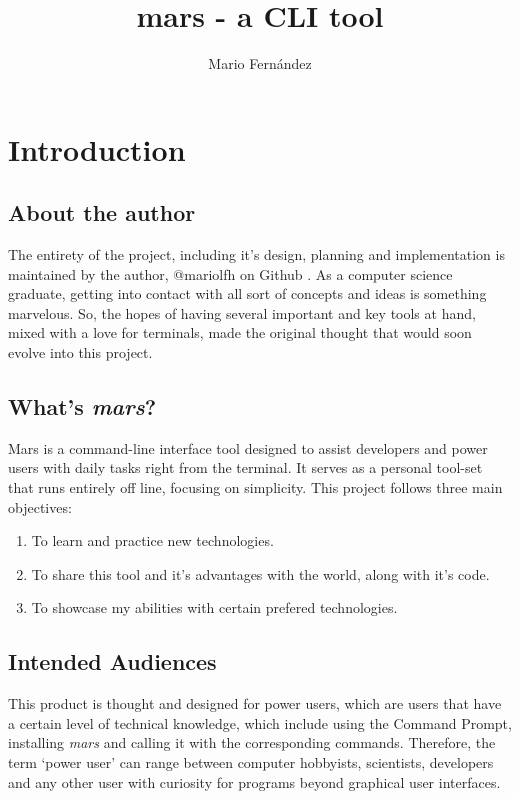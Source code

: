 \documentclass{report}
\title{mars - a CLI tool}
\author{Mario Fernández}
\begin{document}
\maketitle

\tableofcontents

\chapter{Introduction}
\section{About the author}
The entirety of the project, including it's design, planning and implementation is maintained by the author, @mariolfh on Github \cite{githubinc.MariolfhOverview2025}. As a computer science graduate, getting into contact with all sort of concepts and ideas is something marvelous. So, the hopes of having several important and key tools at hand, mixed with a love for terminals, made the original thought that would soon evolve into this project. 

\section{What's \emph{mars}?}
Mars is a command-line interface tool designed to assist developers and power users with daily tasks right from the terminal. It serves as a personal tool-set that runs entirely off line, focusing on simplicity.
This project follows three main objectives:
\begin{enumerate}
\item{To learn and practice new technologies.}
\item{To share this tool and it's advantages with the world, along with it's code.}
\item{To showcase my abilities with certain prefered technologies.}
\end{enumerate}

\section{Intended Audiences}
This product is thought and designed for power users, which are users that have a certain level of technical knowledge, which include using the Command Prompt, installing \emph{mars} and calling it with the corresponding commands. Therefore, the term `power user' can range between computer hobbyists, scientists, developers and any other user with curiosity for programs beyond graphical user interfaces.
\end{document}
